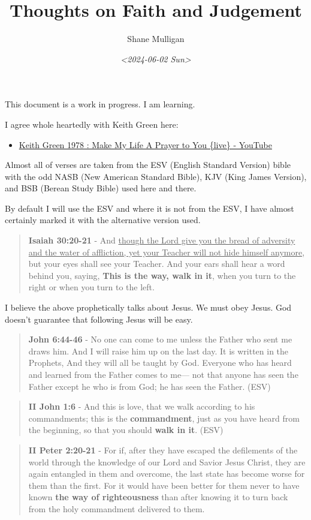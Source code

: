 \documentclass[11pt]{article}
\author{Shane Mulligan}
\date{\textit{<2024-06-02 Sun>}}
\title{Thoughts on Faith and Judgement}
\begin{document}
\maketitle
This document is a work in progress. I am learning.

I agree whole heartedly with Keith Green here:
\begin{itemize}
\item \href{https://www.youtube.com/watch?v=z7oCa9BvO9g}{Keith Green 1978 : Make My Life A Prayer to You \{live\} - YouTube}
\end{itemize}

Almost all of verses are taken from the ESV
(English Standard Version) bible with the odd NASB
(New American Standard Bible), KJV (King
James Version), and BSB (Berean Study Bible) used here and there.

By default I will use the ESV and where it is
not from the ESV, I have almost certainly marked it with the alternative version used.

\begin{quote}
\textbf{Isaiah 30:20-21} - And \uline{though the Lord give you the bread of adversity and the water of affliction, yet your Teacher will not hide himself anymore}, but your eyes shall see your Teacher. And your ears shall hear a word behind you, saying, \textbf{This is the way, walk in it}, when you turn to the right or when you turn to the left.
\end{quote}

I believe the above prophetically talks about Jesus. We must obey Jesus. God doesn't guarantee that following Jesus will be easy.

\begin{quote}
\textbf{John 6:44-46} - No one can come to me unless the Father who sent me draws him. And I will raise him up on the last day. It is written in the Prophets, And they will all be taught by God. Everyone who has heard and learned from the Father comes to me— not that anyone has seen the Father except he who is from God; he has seen the Father. (ESV)
\end{quote}

\begin{quote}
\textbf{II John 1:6} - And this is love, that we walk according to his commandments; this is the \textbf{commandment}, just as you have heard from the beginning, so that you should \textbf{walk in it}. (ESV)
\end{quote}

\begin{quote}
\textbf{II Peter 2:20-21} - For if, after they have escaped the defilements of the world through the knowledge of our Lord and Savior Jesus Christ, they are again entangled in them and overcome, the last state has become worse for them than the first. For it would have been better for them never to have known \textbf{the way of righteousness} than after knowing it to turn back from the holy commandment delivered to them.
\end{quote}
\end{document}
